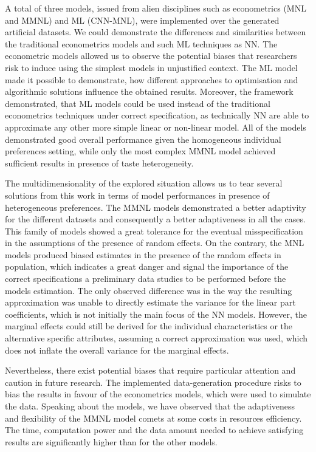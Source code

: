 \documentclass[12pt,]{article}
\begin{document}
A total of three models, issued from alien disciplines such as
econometrics (MNL and MMNL) and ML (CNN-MNL), were implemented over the
generated artificial datasets. We could demonstrate the differences and
similarities between the traditional econometrics models and such ML
techniques as NN. The econometric models allowed us to observe the
potential biases that researchers risk to induce using the simplest
models in unjustified context. The ML model made it possible to
demonstrate, how different approaches to optimisation and algorithmic
solutions influence the obtained results. Moreover, the framework
demonstrated, that ML models could be used instead of the traditional
econometrics techniques under correct specification, as technically NN
are able to approximate any other more simple linear or non-linear
model. All of the models demonstrated good overall performance given the
homogeneous individual preferences setting, while only the most complex
MMNL model achieved sufficient results in presence of taste
heterogeneity.

The multidimensionality of the explored situation allows us to tear
several solutions from this work in terms of model performances in
presence of heterogeneous preferences. The MMNL models demonstrated a
better adaptivity for the different datasets and consequently a better
adaptiveness in all the cases. This family of models showed a great
tolerance for the eventual misspecification in the assumptions of the
presence of random effects. On the contrary, the MNL models produced
biased estimates in the presence of the random effects in population,
which indicates a great danger and signal the importance of the correct
specifications a preliminary data studies to be performed before the
models estimation. The only observed difference was in the way the
resulting approximation was unable to directly estimate the variance for
the linear part coefficients, which is not initially the main focus of
the NN models. However, the marginal effects could still be derived for
the individual characteristics or the alternative specific attributes,
assuming a correct approximation was used, which does not inflate the
overall variance for the marginal effects.

Nevertheless, there exist potential biases that require particular
attention and caution in future research. The implemented
data-generation procedure risks to bias the results in favour of the
econometrics models, which were used to simulate the data. Speaking
about the models, we have observed that the adaptiveness and flexibility
of the MMNL model comets at some costs in resources efficiency. The
time, computation power and the data amount needed to achieve satisfying
results are significantly higher than for the other models.
\end{document}
